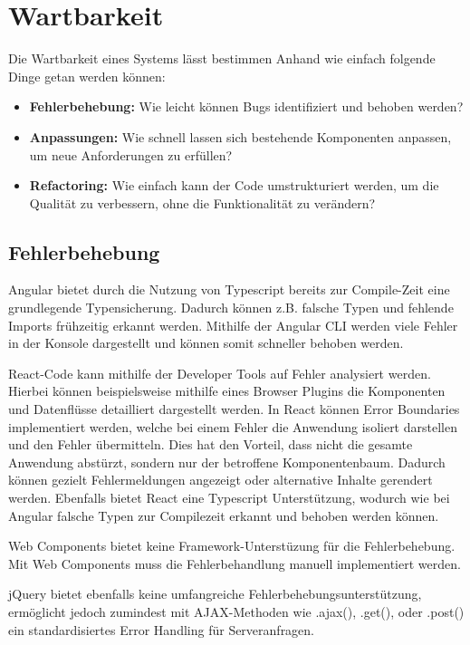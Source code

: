 \documentclass[oneside]{ausarbeitung}
\begin{document}
\section{Wartbarkeit}
Die Wartbarkeit eines Systems lässt bestimmen Anhand wie einfach folgende Dinge getan werden können: 
\begin{itemize}
    \item \textbf{Fehlerbehebung:} Wie leicht können Bugs identifiziert und behoben werden?
    \item \textbf{Anpassungen:} Wie schnell lassen sich bestehende Komponenten anpassen, um neue Anforderungen zu erfüllen?
    \item \textbf{Refactoring:} Wie einfach kann der Code umstrukturiert werden, um die Qualität zu verbessern, ohne die Funktionalität zu verändern?
\end{itemize}

\subsection{Fehlerbehebung}

Angular bietet durch die Nutzung von Typescript bereits zur Compile-Zeit eine grundlegende Typensicherung. Dadurch können z.B. falsche Typen und fehlende Imports frühzeitig erkannt werden. Mithilfe der Angular CLI werden viele Fehler in der Konsole dargestellt und können somit schneller behoben werden. 

React-Code kann mithilfe der Developer Tools auf Fehler analysiert werden. Hierbei können beispielsweise mithilfe eines Browser Plugins die Komponenten und Datenflüsse detailliert dargestellt werden. In React können Error Boundaries implementiert werden, welche bei einem Fehler die Anwendung isoliert darstellen und den Fehler übermitteln. Dies hat den Vorteil, dass nicht die gesamte Anwendung abstürzt, sondern nur der betroffene Komponentenbaum. Dadurch können gezielt Fehlermeldungen angezeigt oder alternative Inhalte gerendert werden. Ebenfalls bietet React eine Typescript Unterstützung, wodurch wie bei Angular falsche Typen zur Compilezeit erkannt und behoben werden können. 

Web Components bietet keine Framework-Unterstüzung für die Fehlerbehebung. Mit Web Components muss die Fehlerbehandlung manuell implementiert werden. 

jQuery bietet ebenfalls keine umfangreiche Fehlerbehebungsunterstützung, ermöglicht jedoch zumindest mit \ac{AJAX}-Methoden wie .ajax(), .get(), oder .post() ein standardisiertes Error Handling für Serveranfragen.
\end{document}
